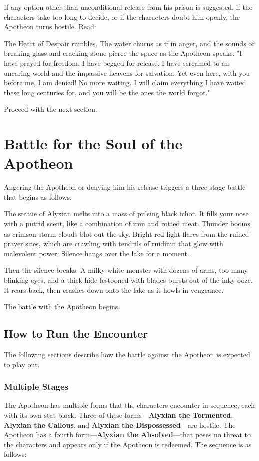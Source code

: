 \documentclass[10pt,a4paper,twoside,fancy,bg=print,twocolumn,openany,nodeprecatedcode]{dndbook}
\begin{document}
If any option other than unconditional release from his prison is suggested, if the characters take too long to decide, or if the characters doubt him openly, the Apotheon turns hostile. Read:

\begin{DndReadAloud}{}
The Heart of Despair rumbles. The water churns as if in anger, and the sounds of breaking glass and cracking stone pierce the space as the Apotheon speaks. "I have prayed for freedom. I have begged for release. I have screamed to an uncaring world and the impassive heavens for salvation. Yet even here, with you before me, I am denied! No more waiting. I will claim everything I have waited these long centuries for, and you will be the ones the world forgot."

\end{DndReadAloud}

Proceed with the next section.

\section{Battle for the Soul of the Apotheon}
Angering the Apotheon or denying him his release triggers a three-stage battle that begins as follows:

\begin{DndReadAloud}{}
The statue of Alyxian melts into a mass of pulsing black ichor. It fills your nose with a putrid scent, like a combination of iron and rotted meat. Thunder booms as crimson storm clouds blot out the sky. Bright red light flares from the ruined prayer sites, which are crawling with tendrils of ruidium that glow with malevolent power. Silence hangs over the lake for a moment.

Then the silence breaks. A milky-white monster with dozens of arms, too many blinking eyes, and a thick hide festooned with blades bursts out of the inky ooze. It rears back, then crashes down onto the lake as it howls in vengeance.

\end{DndReadAloud}

The battle with the Apotheon begins.

\subsection{How to Run the Encounter}
The following sections describe how the battle against the Apotheon is expected to play out.

\subsubsection{Multiple Stages}
The Apotheon has multiple forms that the characters encounter in sequence, each with its own stat block. Three of these forms—\textbf{Alyxian the Tormented}, \textbf{Alyxian the Callous}, and \textbf{Alyxian the Dispossessed}—are hostile. The Apotheon has a fourth form—\textbf{Alyxian the Absolved}—that poses no threat to the characters and appears only if the Apotheon is redeemed. The sequence is as follows:
\end{document}
